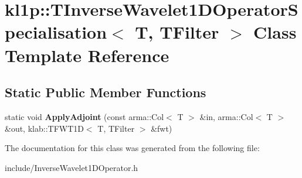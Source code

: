 \hypertarget{classkl1p_1_1TInverseWavelet1DOperatorSpecialisation}{}\section{kl1p\+:\+:T\+Inverse\+Wavelet1\+D\+Operator\+Specialisation$<$ T, T\+Filter $>$ Class Template Reference}
\label{classkl1p_1_1TInverseWavelet1DOperatorSpecialisation}
\subsection*{Static Public Member Functions}
\begin{DoxyCompactItemize}
\item 
static void {\bfseries Apply\+Adjoint} (const arma\+::\+Col$<$ T $>$ \&in, arma\+::\+Col$<$ T $>$ \&out, klab\+::\+T\+F\+W\+T1D$<$ T, T\+Filter $>$ \&fwt)\hypertarget{classkl1p_1_1TInverseWavelet1DOperatorSpecialisation_adaba8a52104e81fbffabf337e9b3f9c5}{}\label{classkl1p_1_1TInverseWavelet1DOperatorSpecialisation_adaba8a52104e81fbffabf337e9b3f9c5}

\end{DoxyCompactItemize}


The documentation for this class was generated from the following file\+:\begin{DoxyCompactItemize}
\item 
include/Inverse\+Wavelet1\+D\+Operator.\+h\end{DoxyCompactItemize}
